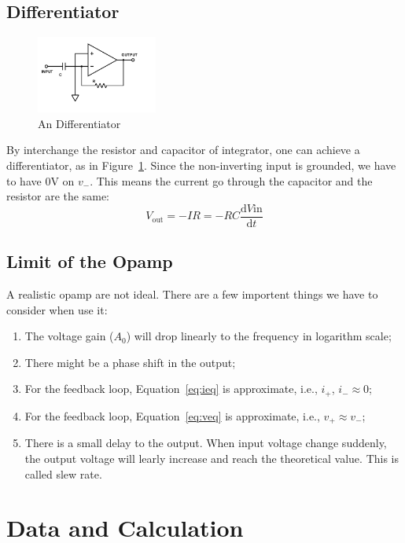 \documentclass[aps,prl,reprint]{revtex4-1}
\newcommand{\de}{\mathrm{d}}
\begin{document}
    \subsection{Differentiator}
        \begin{figure}[h]
            \centering
            \includegraphics[height=1in]{image/Differentiator.pdf}
            \caption{An Differentiator}
            \label{fig:differentiator}
        \end{figure}{}
        By interchange the resistor and capacitor of integrator, one can achieve a differentiator, as in Figure~\ref{fig:differentiator}. Since the non-inverting input is grounded, we have to have 0V on $v_-$. This means the current go through the capacitor and the resistor are the same:
        \begin{equation}
            V_\text{out} = - IR = -RC \frac{\de V\text{in}}{\de t}
        \end{equation}

    \subsection{Limit of the Opamp}
        A realistic opamp are not ideal. There are a few importent things we have to consider when use it:
        \begin{enumerate}
            \item The voltage gain ($A_0$) will drop linearly to the frequency in logarithm scale;
            \item There might be a phase shift in the output;
            \item For the feedback loop, Equation~\ref{eq:ieq} is approximate, i.e., $i_+$, $i_- \approx 0$;
            \item For the feedback loop, Equation~\ref{eq:veq} is approximate, i.e., $v_+ \approx v_-$;
            \item There is a small delay to the output. When input voltage change suddenly, the output voltage will learly increase and reach the theoretical value. This is called slew rate.
        \end{enumerate}
\section{Data and Calculation}
\end{document}
